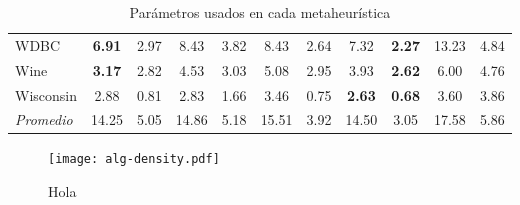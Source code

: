 \begin{table}[h!]
\begin{tabular}{l c c c c c c c c c c}
WDBC         & \textbf{6.91} &  2.97 &  8.43 & 3.82 &  8.43 & 2.64 &  7.32 & \textbf{2.27} & 13.23 &  4.84 \\
Wine         & \textbf{3.17} &  2.82 &  4.53 & 3.03 &  5.08 & 2.95 &  3.93 & \textbf{2.62} &  6.00 &  4.76 \\
Wisconsin    &  2.88 &  0.81 &  2.83 & 1.66 &  3.46 & 0.75 & \textbf{2.63} & \textbf{0.68} &  3.60 &  3.86 \\
\hline
\emph{Promedio} & 14.25 & 5.05 & 14.86 & 5.18 & 15.51 & 3.92 & 14.50 & 3.05 & 17.58 & 5.86\\
\hline
\end{tabular}
\caption{Parámetros usados en cada metaheurística}
\label{res-big}
\end{table}

\begin{figure}[h!]
\centering
\texttt{[image: alg-density.pdf]}
\caption{Hola}
\label{fig-alg-density}
\end{figure}
